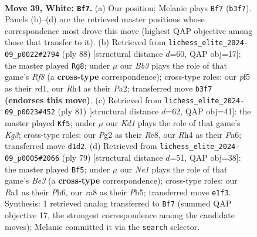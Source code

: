 \documentclass[11pt]{article}
\begin{document}
\clearpage

\begin{figure}[p]\centering
\begin{subfigure}{0.46\textwidth}\centering
\resizebox{\linewidth}{!}{%
\newchessgame
\chessboard[
  setfen={r7/1kP5/p4N2/1b3p2/7R/1B2r3/1P4P1/R2KN3 w - - 0 39},
  showmover=false,
  pgfstyle=straightmove, color=movearrow, markmove={b3-f7}
]}
\caption{}
\end{subfigure}\hfill
\begin{subfigure}{0.46\textwidth}\centering
\resizebox{\linewidth}{!}{%
\newchessgame
\chessboard[
  setfen={5R2/1kp1R3/2p3b1/7p/N6r/1P6/P3PK2/3r4 w - - 9 45},
  showmover=false,
  pgfstyle=straightmove, color=movearrow, markmove={f8-g8}
]}
\caption{}
\end{subfigure}
\\[4pt]
\begin{subfigure}{0.46\textwidth}\centering
\resizebox{\linewidth}{!}{%
\newchessgame
\chessboard[
  setfen={4r3/1p6/p2b2k1/3P4/3Bnp2/1P3Rp1/P1K1R3/8 b - - 1 41},
  showmover=false,
  pgfstyle=straightmove, color=movearrow, markmove={g6-f5}
]}
\caption{}
\end{subfigure}\hfill
\begin{subfigure}{0.46\textwidth}\centering
\resizebox{\linewidth}{!}{%
\newchessgame
\chessboard[
  setfen={8/4k3/2R1b1pp/1p6/1r2n1p1/1P6/1KB4P/5R2 b - - 7 40},
  showmover=false,
  pgfstyle=straightmove, color=movearrow, markmove={e6-f5}
]}
\caption{}
\end{subfigure}
\caption{\textbf{Move 39, White: \texttt{Bf7}.} (a) Our position; Melanie plays \texttt{Bf7} (\texttt{b3f7}). Panels (b)--(d) are the retrieved master positions whose correspondence most drove this move (highest QAP objective among those that transfer to it). (b) Retrieved from \texttt{lichess\_elite\_2024-09\_p0022\#2794} (ply 88) [structural distance $d$=60, QAP obj=17]: the master played \texttt{Rg8}; under $\mu$ our \emph{Bb3} plays the role of that game's \emph{Rf8} (a \textbf{cross-type} correspondence); cross-type roles: our \emph{p}f5 as their \emph{r}d1, our \emph{R}h4 as their \emph{P}a2; transferred move \texttt{b3f7} \textbf{(endorses this move)}. (c) Retrieved from \texttt{lichess\_elite\_2024-09\_p0023\#452} (ply 81) [structural distance $d$=62, QAP obj=41]: the master played \texttt{Kf5}; under $\mu$ our \emph{Kd1} plays the role of that game's \emph{Kg3}; cross-type roles: our \emph{P}g2 as their \emph{R}e8, our \emph{R}h4 as their \emph{P}a6; transferred move \texttt{d1d2}. (d) Retrieved from \texttt{lichess\_elite\_2024-09\_p0005\#2066} (ply 79) [structural distance $d$=51, QAP obj=38]: the master played \texttt{Bf5}; under $\mu$ our \emph{Ne1} plays the role of that game's \emph{Be3} (a \textbf{cross-type} correspondence); cross-type roles: our \emph{R}a1 as their \emph{P}h6, our \emph{r}a8 as their \emph{P}b5; transferred move \texttt{e1f3}. Synthesis: 1 retrieved analog transferred to \texttt{Bf7} (summed QAP objective 17, the strongest correspondence among the candidate moves); Melanie committed it via the \texttt{search} selector.}
\label{fig:thought-m76}
\end{figure}
\end{document}
